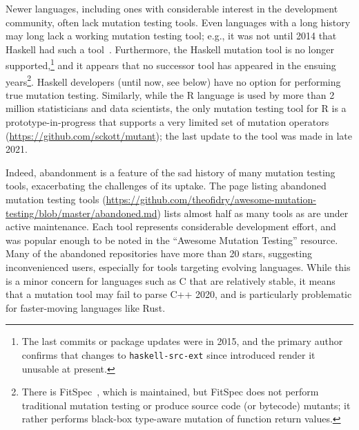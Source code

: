 \documentclass[acmsmall,screen,review,anonymous]{acmart}
\begin{document}
Newer languages, including ones with considerable interest
in the development community, often lack mutation testing tools.  Even
languages with a long history may long lack a working mutation testing
tool; e.g., it was not until 2014 that Haskell had such a tool~\cite{mucheck}. 
Furthermore, the Haskell mutation tool is no longer
supported,\footnote{The last commits or package updates were in 2015, and the
primary author confirms that changes to {\tt haskell-src-ext} since
introduced render it unusable at present.} and it
appears that no successor tool has appeared in the ensuing
years\footnote{There is FitSpec~\cite{FitSpec}, which is maintained,
  but FitSpec does not perform traditional mutation testing or produce
  source code (or bytecode) mutants; it rather
  performs black-box type-aware mutation of function return values.}.
Haskell developers (until now, see below) have no option for
performing true mutation testing.   Similarly, while the R language is
used by more than 2 million statisticians and data scientists, the
only mutation testing tool for R is a prototype-in-progress that
supports a very limited set of mutation operators
(\url{https://github.com/sckott/mutant}); the last update to the tool
was made in late 2021.

Indeed, abandonment is a feature of the sad history
of many mutation testing tools, exacerbating the challenges of its uptake.  The page listing abandoned
mutation testing tools
(\url{https://github.com/theofidry/awesome-mutation-testing/blob/master/abandoned.md})
lists almost half as many tools as are under active maintenance. Each tool represents 
considerable development effort, and was
popular enough to be noted in the ``Awesome
Mutation Testing'' resource. Many of the abandoned repositories have more than
20 stars, suggesting inconvenienced users, especially for tools targeting
evolving languages. While this is a minor concern for languages such as C
that are relatively stable, it means that a mutation tool may fail
to parse C++ 2020, and is particularly problematic for 
faster-moving languages like Rust.
\end{document}
